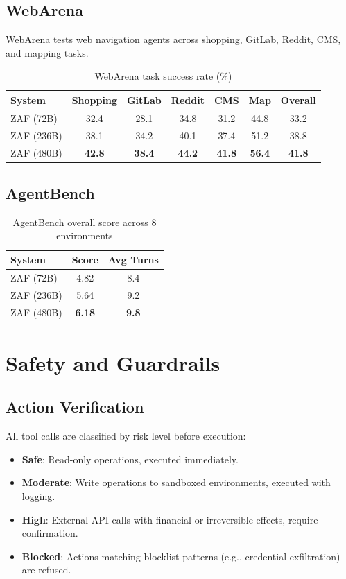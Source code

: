 \documentclass[11pt,a4paper]{article}
\begin{document}
\subsection{WebArena}

WebArena tests web navigation agents across shopping, GitLab, Reddit, CMS, and mapping tasks.

\begin{table}[H]
\centering
\caption{WebArena task success rate (\%)}
\label{tab:webarena}
\begin{tabular}{lcccccc}
\toprule
System & Shopping & GitLab & Reddit & CMS & Map & Overall \\
\midrule
ZAF (72B) & 32.4 & 28.1 & 34.8 & 31.2 & 44.8 & 33.2 \\
ZAF (236B) & 38.1 & 34.2 & 40.1 & 37.4 & 51.2 & 38.8 \\
ZAF (480B) & \textbf{42.8} & \textbf{38.4} & \textbf{44.2} & \textbf{41.8} & \textbf{56.4} & \textbf{41.8} \\
\bottomrule
\end{tabular}
\end{table}

\subsection{AgentBench}

\begin{table}[H]
\centering
\caption{AgentBench overall score across 8 environments}
\label{tab:agentbench}
\begin{tabular}{lcc}
\toprule
System & Score & Avg Turns \\
\midrule
ZAF (72B) & 4.82 & 8.4 \\
ZAF (236B) & 5.64 & 9.2 \\
ZAF (480B) & \textbf{6.18} & \textbf{9.8} \\
\bottomrule
\end{tabular}
\end{table}

\section{Safety and Guardrails}

\subsection{Action Verification}

All tool calls are classified by risk level before execution:
\begin{itemize}
  \item \textbf{Safe}: Read-only operations, executed immediately.
  \item \textbf{Moderate}: Write operations to sandboxed environments, executed with logging.
  \item \textbf{High}: External API calls with financial or irreversible effects, require confirmation.
  \item \textbf{Blocked}: Actions matching blocklist patterns (e.g., credential exfiltration) are refused.
\end{itemize}
\end{document}
